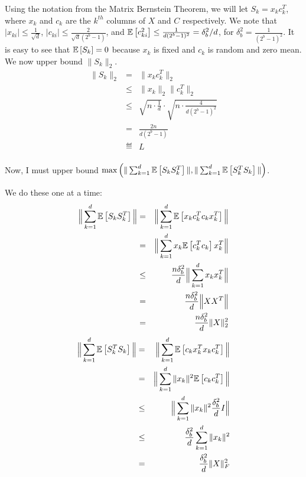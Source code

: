 Using the notation from the Matrix Bernstein Theorem, we will let $S_k = x_k c_k^T$, where $x_k$ and $c_k$ are the $k^{th}$ columns of $X$ and $C$ respectively.
We note that $|x_{ki}| \leq \frac{1}{\sqrt{d}}$, $|c_{ki}| \leq \frac{2}{\sqrt{d}(2^b-1)}$, and $\expect{}{c_{ki}^2} \leq \frac{1}{d(2^b-1)^2} = \delta_b^2/d$, for $\delta_b^2 = \frac{1}{(2^b-1)^2}$.
It is easy to see that $\expect{}{S_k} = 0$ because $x_k$ is fixed and $c_k$ is random and zero mean.
We now upper bound $\|S_k\|_2$.
\begin{eqnarray*}
\|S_k\|_2 &=& \|x_k c_k^T\|_2 \\
&\leq&  \|x_k\|_2 \|c_k^T\|_2 \\
&\leq& \sqrt{n \cdot \frac{1}{d}} \cdot \sqrt{n \cdot \frac{4}{d(2^b-1)^2}}\\
&=& \frac{2n}{d(2^b-1)}\\
&\eqdef& L\\
\end{eqnarray*}

Now, I must upper bound $\max\Big(\|\sum_{k=1}^d \expect{}{S_k S_k^T}\|, \|\sum_{k=1}^d \expect{}{S_k^T S_k}\|\Big)$.

We do these one at a time:
\begin{eqnarray*}
\Big\|\sum_{k=1}^d \expect{}{S_k S_k^T}\Big\| &=& \Big\|\sum_{k=1}^d \expect{}{x_k c_k^T c_k x_k^T }\Big\|\\
&=& \Big\|\sum_{k=1}^d x_k \expect{}{c_k^T c_k} x_k^T \Big\| \\
&\leq& \frac{n\delta_b^2}{d}\Big\|\sum_{k=1}^d x_k x_k^T \Big\| \\
&=&\frac{n\delta_b^2}{d}\Big\|XX^T \Big\| \\
&=&\frac{n\delta_b^2}{d}\|X\|_2^2 \\
\end{eqnarray*}
\begin{eqnarray*}
	\Big\|\sum_{k=1}^d \expect{}{S_k^T S_k}\Big\| &=& \Big\|\sum_{k=1}^d \expect{}{c_k x_k^T x_k c_k^T}\Big\|\\
	&=& \Big\|\sum_{k=1}^d \|x_k\|^2 \expect{}{c_k c_k^T}\Big\| \\
	&\leq& \Big\|\sum_{k=1}^d \|x_k\|^2 \frac{\delta_b^2}{d}I\Big\| \\
	&\leq& \frac{\delta_b^2}{d} \sum_{k=1}^d \|x_k\|^2 \\
	&=& \frac{\delta_b^2}{d} \|X\|_F^2 \\
\end{eqnarray*}


